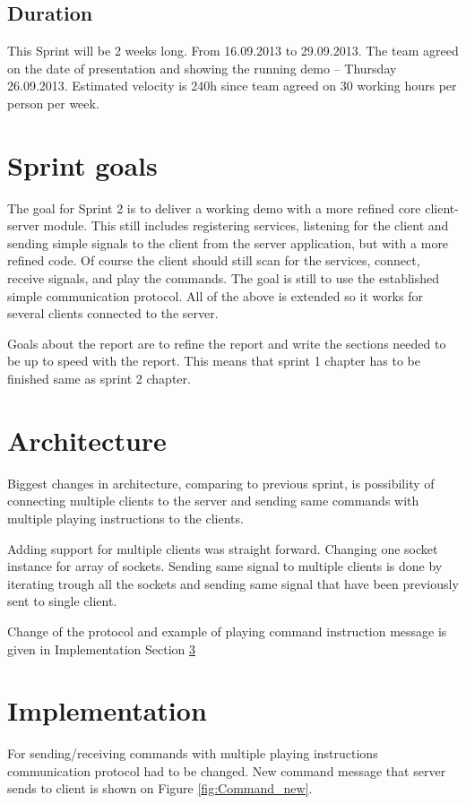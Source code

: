 \subsection{Duration}
This Sprint will be 2 weeks long. From 16.09.2013 to 29.09.2013.
The team agreed on the date of presentation and showing the running demo -- Thursday 26.09.2013.
Estimated velocity is 240h since team agreed on 30 working hours per person per week.

\section{Sprint goals}
The goal for Sprint 2 is to deliver a working demo with a more refined core client-server module. 
This still includes registering services, listening for the client and sending simple signals to the client from the server application, but with a more refined code. 
Of course the client should still scan for the services, connect, receive signals, and play the commands. 
The goal is still to use the established simple communication protocol. 
All of the above is extended so it works for several clients connected to the server.

Goals about the report are to refine the report and write the sections needed to be up to speed with the report. This means that sprint 1 chapter has to be finished same as sprint 2 chapter. 

\section{Architecture}
Biggest changes in architecture, comparing to previous sprint, is possibility of connecting multiple clients to the server and sending same commands with multiple playing instructions to the clients. 

Adding support for multiple clients was straight forward. Changing one socket instance for array of sockets. Sending same signal to multiple clients is done by iterating trough all the sockets and sending same signal that have been previously sent to single client.

Change of the protocol and example of playing command instruction message is given in Implementation Section \ref{section:impl}


\section{Implementation} \label{section:impl}
For sending/receiving commands with multiple playing instructions communication protocol had to be changed. New command message that server sends to client is shown on Figure \ref{fig:Command_new}.

